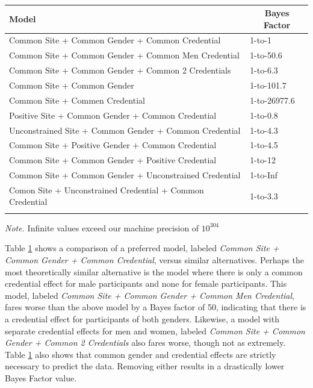 \documentclass[english,man]{apa6}
\theoremstyle{definition}
\theoremstyle{definition}
\theoremstyle{remark}
\begin{document}
\begin{table}[tbp]
\begin{center}
\begin{threeparttable}
\caption{\label{tab:ml3BF}}
\begin{tabular}{ll}
\toprule
Model & \multicolumn{1}{c}{Bayes Factor}\\
\midrule
Common Site + Common Gender + Common Credential & 1-to-1\\
Common Site + Common Gender + Common Men Credential & 1-to-50.6\\
Common Site + Common Gender + Common 2 Credentials & 1-to-6.3\\
Common Site + Common Gender & 1-to-101.7\\
Common Site + Commen Credential & 1-to-26977.6\\
Positive Site + Common Gender + Common Credential & 1-to-0.8\\
Unconstrained Site + Common Gender + Common Credential & 1-to-4.3\\
Common Site + Positive Gender + Common Credential & 1-to-4.5\\
Common Site + Common Gender + Positive Credential & 1-to-12\\
Common Site + Common Gender + Unconstrained Credential & 1-to-Inf\\
Comon Site + Unconstrained Credential + Common Credential & 1-to-3.3\\
\bottomrule
\addlinespace
\end{tabular}
\begin{tablenotes}[para]
\textit{Note.} Infinite values exceed our machine precision of $10^304$
\end{tablenotes}
\end{threeparttable}
\end{center}
\end{table}

Table \ref{tab:ml3BF} shows a comparison of a preferred model, labeled
\emph{Common Site + Common Gender + Common Credential}, versus similar
alternatives. Perhaps the most theoretically similar alternative is the
model where there is only a common credential effect for male
participants and none for female participants. This model, labeled
\emph{Common Site + Common Gender + Common Men Credential}, fares worse
than the above model by a Bayes factor of 50, indicating that there is a
credential effect for participants of both genders. Likewise, a model
with separate credential effects for men and women, labeled \emph{Common
Site + Common Gender + Common 2 Credentials} also fares worse, though
not as extremely. Table \ref{tab:ml3BF} also shows that common gender
and credential effects are strictly necessary to predict the data.
Removing either results in a drastically lower Bayes Factor value.
\end{document}
